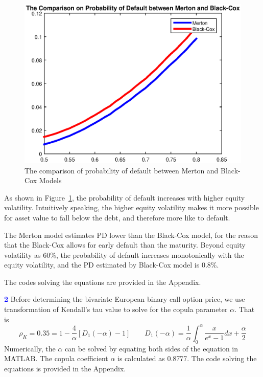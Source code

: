 \documentclass[a4paper,11pt] {article}
\begin{document}
\begin{center}
\begin{figure}
  \centering
  \includegraphics[scale=0.7]{PDs.eps}
  \caption{The comparison of probability of default between Merton and Black-Cox Models}\label{fig::PDs}
\end{figure}
\end{center}

As shown in Figure~\ref{fig::PDs}, the probability of default increases with higher equity volatility. Intuitively speaking, the higher equity volatility makes it more possible for asset value to fall below the debt, and therefore more like to default.

The Merton model estimates PD lower than the Black-Cox model, for the reason that the Black-Cox allows for early default than the maturity. Beyond equity volatility as 60\%, the probability of default increases monotonically with the equity volatility, and the PD estimated by Black-Cox model is 0.8\%.

The codes solving the equations are provided in the Appendix.

\bigskip

\textcolor{blue}{\bf 2} Before determining the bivariate European binary call option price, we use transformation of Kendall's tau value to solve for the copula parameter $\alpha$. That is
$$
\rho_K = 0.35 = 1-\frac{4}{\alpha}[D_1(-\alpha)-1] \qquad D_1(-\alpha) = \frac{1}{\alpha} \int_0^\alpha \frac{x}{e^x-1}dx + \frac{\alpha}{2}
$$
Numerically, the $\alpha$ can be solved by equating both sides of the equation in MATLAB. The copula coefficient $\alpha$ is calculated as 0.8777.  The code solving the equations is provided in the Appendix.
\end{document}
